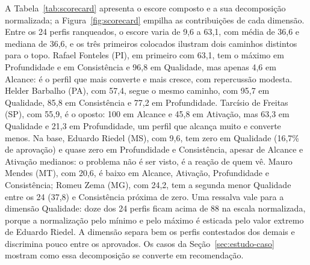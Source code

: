 A Tabela~\ref{tab:scorecard} apresenta o escore composto e a sua decomposição normalizada; a Figura~\ref{fig:scorecard} empilha as contribuições de cada dimensão. Entre os 24 perfis ranqueados, o escore varia de 9,6 a 63,1, com média de 36,6 e mediana de 36,6, e os três primeiros colocados ilustram dois caminhos distintos para o topo. Rafael Fonteles (PI), em primeiro com 63,1, tem o máximo em Profundidade e em Consistência e 96,8 em Qualidade, mas apenas 4,6 em Alcance: é o perfil que mais converte e mais cresce, com repercussão modesta. Helder Barbalho (PA), com 57,4, segue o mesmo caminho, com 95,7 em Qualidade, 85,8 em Consistência e 77,2 em Profundidade. Tarcísio de Freitas (SP), com 55,9, é o oposto: 100 em Alcance e 45,8 em Ativação, mas 63,3 em Qualidade e 21,3 em Profundidade, um perfil que alcança muito e converte menos. Na base, Eduardo Riedel (MS), com 9,6, tem zero em Qualidade (16,7\% de aprovação) e quase zero em Profundidade e Consistência, apesar de Alcance e Ativação medianos: o problema não é ser visto, é a reação de quem vê. Mauro Mendes (MT), com 20,6, é baixo em Alcance, Ativação, Profundidade e Consistência; Romeu Zema (MG), com 24,2, tem a segunda menor Qualidade entre os 24 (37,8) e Consistência próxima de zero. Uma ressalva vale para a dimensão Qualidade: doze dos 24 perfis ficam acima de 88 na escala normalizada, porque a normalização pelo mínimo e pelo máximo é esticada pelo valor extremo de Eduardo Riedel. A dimensão separa bem os perfis contestados dos demais e discrimina pouco entre os aprovados. Os casos da Seção~\ref{sec:estudo-caso} mostram como essa decomposição se converte em recomendação.

